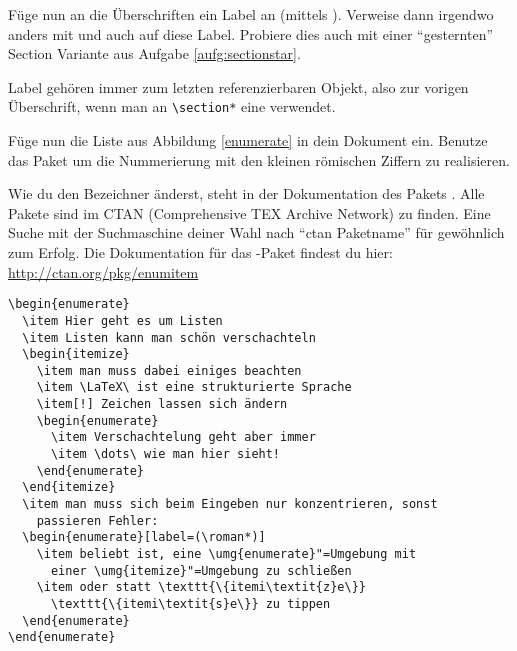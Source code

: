 \begin{uebung}
\item Füge nun an die Überschriften ein Label an (mittels ).
    Verweise dann irgendwo anders mit  und auch
     auf diese Label. Probiere dies auch mit einer \enquote{gesternten}
    Section Variante aus Aufgabe \ref{aufg:sectionstar}.
    \begin{loesung}
        Label gehören immer zum letzten referenzierbaren Objekt, also zur vorigen Überschrift, wenn man an \verb|\section*| eine verwendet.
    \end{loesung}

\item Füge nun die Liste aus Abbildung \ref{enumerate} in dein Dokument ein.
    Benutze das Paket  um die Nummerierung mit den kleinen
    römischen Ziffern zu realisieren.
    \begin{hinweis}
        Wie du den Bezeichner änderst, steht in der Dokumentation des Pakets
        . Alle Pakete sind im CTAN (Comprehensive TEX Archive Network)
        zu finden. Eine Suche mit der Suchmaschine deiner Wahl nach
        \enquote{ctan Paketname} für gewöhnlich zum Erfolg. Die Dokumentation für
        das -Paket findest du hier: \url{http://ctan.org/pkg/enumitem}
    \end{hinweis}
    \begin{loesung}
\begin{verbatim}
\begin{enumerate}
  \item Hier geht es um Listen
  \item Listen kann man schön verschachteln
  \begin{itemize}
    \item man muss dabei einiges beachten
    \item \LaTeX\ ist eine strukturierte Sprache
    \item[!] Zeichen lassen sich ändern
    \begin{enumerate} 
      \item Verschachtelung geht aber immer
      \item \dots\ wie man hier sieht!
    \end{enumerate}
  \end{itemize}
  \item man muss sich beim Eingeben nur konzentrieren, sonst 
    passieren Fehler:
  \begin{enumerate}[label=(\roman*)]
    \item beliebt ist, eine \umg{enumerate}"=Umgebung mit 
      einer \umg{itemize}"=Umgebung zu schließen
    \item oder statt \texttt{\{itemi\textit{z}e\}} 
      \texttt{\{itemi\textit{s}e\}} zu tippen
  \end{enumerate}
\end{enumerate}
\end{verbatim}
    \end{loesung}
    \label{markup:last}
    

\end{uebung}
